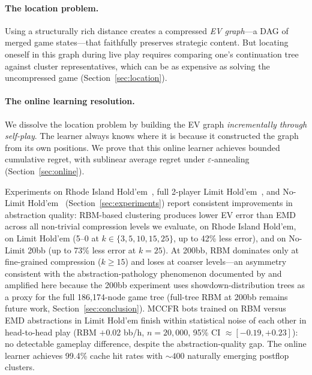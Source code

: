 \documentclass[11pt]{article}
\begin{document}
\paragraph{The location problem.}  Using a structurally rich distance
creates a compressed \emph{EV graph}---a DAG of merged game
states---that faithfully preserves strategic content. But locating
oneself in this graph during live play requires comparing one's
continuation tree against cluster representatives, which can be as
expensive as solving the uncompressed game
(Section~\ref{sec:location}).

\paragraph{The online learning resolution.}  We dissolve the location
problem by building the EV graph \emph{incrementally through self-play}.
The learner always knows where it is because it constructed the graph
from its own positions. We prove that this online learner achieves
bounded cumulative regret, with sublinear average regret under
$\varepsilon$-annealing (Section~\ref{sec:online}).

Experiments on Rhode Island Hold'em~\citep{gilpin2005rhode}, full
2-player Limit Hold'em~\citep{bowling2015solving}, and No-Limit
Hold'em~\citep{brown2018superhuman} (Section~\ref{sec:experiments})
report consistent improvements in abstraction quality: RBM-based
clustering produces lower EV error than EMD across all non-trivial
compression levels we evaluate, on Rhode Island Hold'em, on Limit
Hold'em (5--0 at $k \in \{3,5,10,15,25\}$, up to 42\% less error), and
on No-Limit 20bb (up to 73\% less error at $k{=}25$). At 200bb, RBM
dominates only at fine-grained compression ($k \ge 15$) and loses at
coarser levels---an asymmetry consistent with the
abstraction-pathology phenomenon documented by
\citet{waugh2009abstraction} and amplified here because the 200bb
experiment uses showdown-distribution trees as a proxy for the full
186{,}174-node game tree (full-tree RBM at 200bb remains future work,
Section~\ref{sec:conclusion}). MCCFR bots trained on RBM versus EMD
abstractions in Limit Hold'em finish within statistical noise of each
other in head-to-head play (RBM $+$0.02 bb/h, $n{=}20{,}000$, 95\% CI
$\approx [-0.19, +0.23]$): no detectable gameplay difference, despite
the abstraction-quality gap. The online learner achieves 99.4\% cache
hit rates with ${\sim}400$ naturally emerging postflop clusters.

\end{document}
